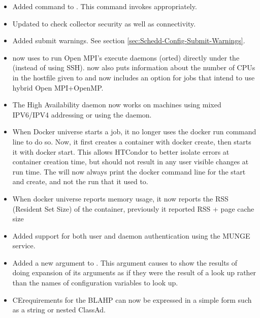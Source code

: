 \begin{itemize}
\item Added  command to .  This command invokes
  appropriately.

\item Updated   to check collector security
as well as connectivity.

\item Added submit warnings.  See section \ref{sec:Schedd-Config-Submit-Warnings}.

\item {} now uses  to run Open MPI's execute daemons
(orted) directly under the  (instead of using SSH). 
now also puts information about the number of CPUs in the hostfile given to 
and now includes an option for jobs that intend to use hybrid Open MPI+OpenMP.

\item The High Availability  daemon now works on machines
using mixed IPV6/IPV4 addressing or using the  daemon.

\item When Docker universe starts a job, it no longer uses the docker
run command line to do so.  Now, it first creates a container with
docker create, then starts it with docker start.  This allows HTCondor
to better isolate errors at container creation time, but should not
result in any user visible changes at run time.  The  will
now always print the docker command line for the start and create,
and not the run that it used to.

\item When docker universe reports memory usage, it now reports the
RSS (Resident Set Size) of the container, previously it reported
RSS + page cache size

\item Added support for both user and daemon authentication using the MUNGE service.

\item Added a new  argument to .  This argument causes
 to show the results of doing \Expr{\$()} expansion of its arguments
as if they were the result of a look up rather than the names of configuration variables
to look up.

\item CErequirements for the BLAHP can now be expressed in a simple form
such as a string or nested ClassAd.

\end{itemize}

